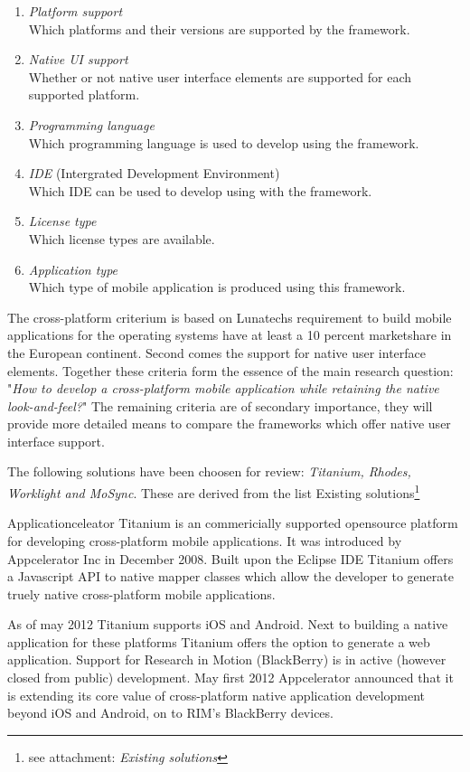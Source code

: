 \begin{enumerate}
\item \emph{Platform support}\\
Which platforms and their versions are supported by the framework.
\item \emph{Native UI support}\\
Whether or not native user interface elements are supported for each supported platform.
\item \emph{Programming language}\\
Which programming language is used to develop using the framework.
\item \emph{IDE} (Intergrated Development Environment)\\
Which IDE can be used to develop using with the framework.
\item \emph{License type}\\
Which license types are available.
\item \emph{Application type}\\
Which type of mobile application is produced using this framework.
\end{enumerate}

The cross-platform criterium is based on Lunatechs requirement to build mobile applications for the operating systems have at least a 10 percent marketshare in the European continent. Second  comes the support for native user interface elements. Together these criteria form the essence of the main research question: "\emph{How to develop a cross-platform mobile application while retaining the native look-and-feel?}"
The remaining criteria are of secondary importance, they will provide more detailed means to compare the frameworks which offer native user interface support.

The following solutions have been choosen for review: \emph{Titanium, Rhodes, Worklight and MoSync}. These are derived from the list Existing solutions\footnote{see attachment: \emph{Existing solutions}} %


Applicationceleator Titanium is an commericially supported opensource platform for developing cross-platform mobile applications. It was introduced by Appcelerator Inc in December 2008. Built upon the Eclipse IDE Titanium offers a Javascript API to native mapper classes which allow the developer to generate truely native cross-platform mobile applications.

As of may 2012 Titanium supports iOS and Android. Next to building a native application for these platforms Titanium offers the option to generate a web application. 
Support for Research in Motion (BlackBerry) is in active (however closed from public) development. May first 2012 Appcelerator announced that it is extending its core value of cross-platform native application development beyond iOS and Android, on to RIM's BlackBerry devices.\cite{Asher2012}

